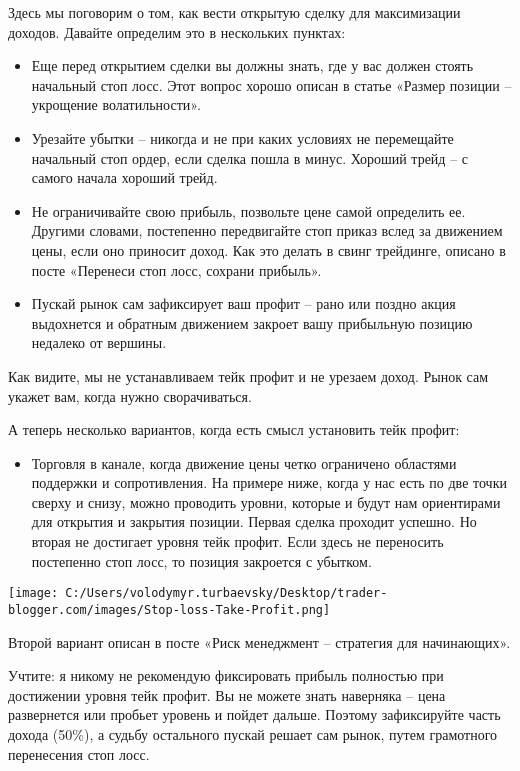 \documentclass[a5paper]{article}
\begin{document}
Здесь мы поговорим о том, как вести открытую сделку для максимизации доходов. Давайте определим это в нескольких пунктах:
\begin{itemize}
\item     Еще перед открытием сделки вы должны знать, где у вас должен стоять начальный стоп лосс. Этот вопрос хорошо описан в статье «Размер позиции – укрощение волатильности».
\item     Урезайте убытки – никогда и не при каких условиях не перемещайте начальный стоп ордер, если сделка пошла в минус. Хороший трейд – с самого начала хороший трейд.
\item     Не ограничивайте свою прибыль, позвольте цене самой определить ее. Другими словами, постепенно передвигайте стоп приказ вслед за движением цены, если оно приносит доход. Как это делать в свинг трейдинге, описано в посте «Перенеси стоп лосс, сохрани прибыль».
\item     Пускай рынок сам зафиксирует ваш профит – рано или поздно акция выдохнется и обратным движением закроет вашу прибыльную позицию недалеко от вершины.
\end{itemize}

Как видите, мы не устанавливаем тейк профит и не урезаем доход. Рынок сам укажет вам, когда нужно сворачиваться.

А теперь несколько вариантов, когда есть смысл установить тейк профит:
\begin{itemize}
\item     Торговля в канале, когда движение цены четко ограничено областями поддержки и сопротивления. На примере ниже, когда у нас есть по две точки сверху и снизу, можно проводить уровни, которые и будут нам ориентирами для открытия и закрытия позиции. Первая сделка проходит успешно. Но вторая не достигает уровня тейк профит. Если здесь не переносить постепенно стоп лосс, то позиция закроется с убытком.
\end{itemize}

\texttt{[image: C:/Users/volodymyr.turbaevsky/Desktop/trader-blogger.com/images/Stop-loss-Take-Profit.png]}

    Второй вариант описан в посте «Риск менеджмент – стратегия для начинающих».

Учтите: я никому не рекомендую фиксировать прибыль полностью при
достижении уровня тейк профит. Вы не можете знать наверняка – цена
развернется или пробьет уровень и пойдет дальше. Поэтому зафиксируйте
часть дохода (50\%), а судьбу остального пускай решает сам рынок,
путем грамотного перенесения стоп лосс.
\end{document}
